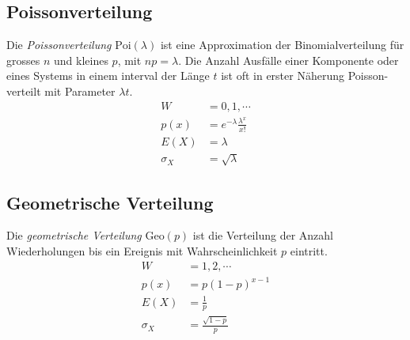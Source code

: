 \subsection{Poissonverteilung}
Die \emph{Poissonverteilung} $\mathrm{Poi}(\lambda)$ ist eine Approximation der Binomialverteilung für grosses $n$ und kleines $p$, mit $np = \lambda$. Die Anzahl Ausfälle einer Komponente oder eines Systems in einem interval der Länge $t$ ist oft in erster Näherung Poisson-verteilt mit Parameter $\lambda t$.
\begin{align}
	W &= {0,1,\cdots}\\
	p(x) &= e^{-\lambda} \frac{\lambda^x}{x!}\\
	E(X) &= \lambda\\
	\sigma_X &= \sqrt{\lambda}
\end{align}

\subsection{Geometrische Verteilung}
Die \emph{geometrische Verteilung} $\mathrm{Geo}(p)$ ist die Verteilung der Anzahl Wiederholungen bis ein Ereignis mit Wahrscheinlichkeit $p$ eintritt.
\begin{align}
	W &= {1,2,\cdots}\\
	p(x) &= p(1-p)^{x-1}\\
	E(X) &= \frac{1}{p}\\
	\sigma_X &= \frac{\sqrt{1-p}}{p}
\end{align}
